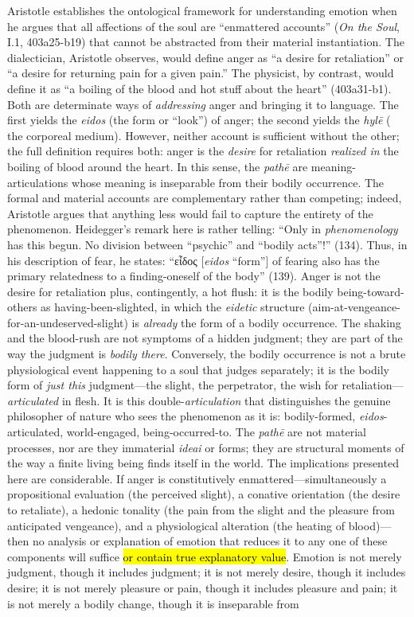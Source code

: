 \documentclass{article}
\newcommand{\gk}[1]{{\greekfont #1}}
\begin{document}
Aristotle  establishes the ontological framework for understanding emotion when he argues that all affections of the soul are ``enmattered accounts'' (\textit{On the Soul}, I.1, 403a25-b19) that cannot be abstracted from their material instantiation. The dialectician, Aristotle observes, would define anger as ``a desire for retaliation'' or ``a desire for returning pain for a given pain.'' The physicist, by contrast, would define it as ``a boiling of the blood and hot stuff about the heart'' (403a31-b1). Both are determinate ways of \textit{addressing} anger and bringing it to language. The first yields the \textit{eidos} (the form or ``look'') of anger; the second yields the \textit{hylē} ( the corporeal medium). However, neither account is sufficient without the other; the full definition requires both: anger is the \textit{desire} for retaliation \textit{realized in} the boiling of blood around the heart. In this sense, the \textit{pathē} are meaning-articulations whose meaning is inseparable from their bodily occurrence. The formal and material accounts are complementary rather than competing; indeed, Aristotle argues that anything less would fail to capture the entirety of the phenomenon. Heidegger's remark here is rather telling: ``Only in \textit{phenomenology} has this begun. No division between ``psychic'' and ``bodily acts''!'' (134). Thus, in his description of fear, he states: ``\gk{εἶδος} [\textit{eidos} ``form''] of fearing also has the primary relatedness to a finding-oneself of the body'' (139). Anger is not the desire for retaliation plus, contingently, a hot flush: it is the bodily being-toward-others as having-been-slighted, in which the \textit{eidetic} structure (aim-at-vengeance-for-an-undeserved-slight) is \textit{already} the form of a bodily occurrence. The shaking and the blood-rush are not symptoms of a hidden judgment; they are part of the way the judgment is \textit{bodily there}. Conversely, the bodily occurrence is not a brute physiological event happening to a soul that judges separately; it is the bodily form of \textit{just this} judgment---the slight, the perpetrator, the wish for retaliation---\textit{articulated} in flesh. It is this double-\textit{articulation} that distinguishes the genuine philosopher of nature who sees the phenomenon as it is: bodily-formed, \textit{eidos}-articulated, world-engaged, being-occurred-to. The \textit{pathē} are not material processes, nor are they immaterial \textit{ideai} or forms; they are structural moments of the way a finite living being finds itself in the world. The implications presented here are considerable. If anger is constitutively enmattered---simultaneously a propositional evaluation (the perceived slight), a conative orientation (the desire to retaliate), a hedonic tonality (the pain from the slight and the pleasure from anticipated vengeance), and a physiological alteration (the heating of blood)---then no analysis or explanation of emotion that reduces it to any one of these components will suffice \hl{or contain true explanatory value}. Emotion is not merely judgment, though it includes judgment; it is not merely desire, though it includes desire; it is not merely pleasure or pain, though it includes pleasure and pain; it is not merely a bodily change, though it is inseparable from 
\end{document}
